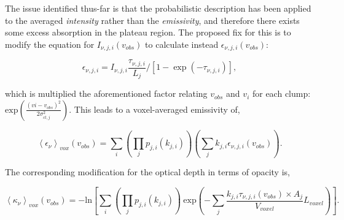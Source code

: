 \documentclass[a4paper]{article}
\begin{document}
    The issue identified thus-far is that the probabilistic description has been applied to the averaged \textit{intensity} rather than the \textit{emissivity}, and therefore there exists some excess absorption in the plateau region.
    The proposed fix for this is to modify the equation for \(I_{\nu, j, i} (v_{obs})\) to calculate instead \(\epsilon_{\nu, j, i} (v_{obs})\):

    \[
    \epsilon_{\nu,j,i} = I_{\nu,j,i} \frac{\tau_{\nu,j,i}} {L_{j}} / [ 1 - \exp(-\tau_{\nu,j,i}) ],
    \]

    which is multiplied the aforementioned factor relating \(v_{obs}\) and \(v_i\) for each clump: \(\mathrm{exp}(\frac{(vi - v_{obs})^2}{2 \sigma_{cl, j}^2})\).
    This leads to a voxel-averaged emissivity of,

    \[
    \left< \epsilon_\nu \right>_{vox} (v_{obs}) = \sum_i \left( \prod_j p_{j,i}(k_{j,i}) \right) \left( \sum_j k_{j,i} \epsilon_{\nu,j,i} (v_{obs}) \right).
    \]

    The corresponding modification for the optical depth in terms of opacity is,

    \[
    \left< \kappa_\nu \right>_{vox} (v_{obs}) = -\mathrm{ln} \left[ \sum_i \left( \prod_j p_{j,i}(k_{j,i}) \right) \ \mathrm{exp} \left( - \sum_j \frac{k_{j,i} \tau_{\nu,j,i} (v_{obs}) \times A_{j}}{V_{voxel}} L_{voxel} \right) \right].
    \]
\end{document}
